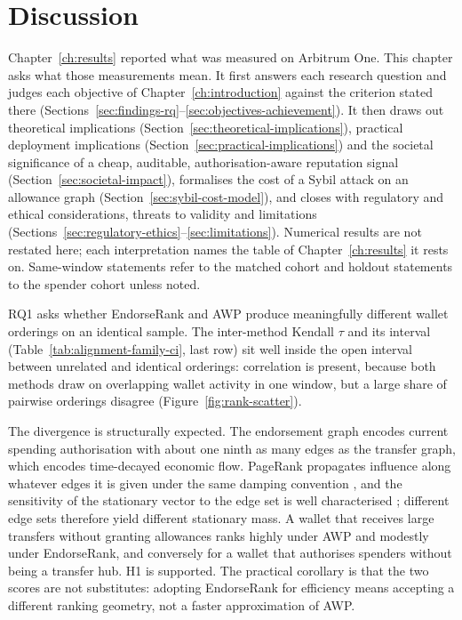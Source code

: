 \chapter{Discussion}
\label{ch:discussion}

Chapter~\ref{ch:results} reported what was measured on Arbitrum One. This chapter asks what those measurements mean. It first answers each research question and judges each objective of Chapter~\ref{ch:introduction} against the criterion stated there (Sections~\ref{sec:findings-rq}--\ref{sec:objectives-achievement}). It then draws out theoretical implications (Section~\ref{sec:theoretical-implications}), practical deployment implications (Section~\ref{sec:practical-implications}) and the societal significance of a cheap, auditable, authorisation-aware reputation signal (Section~\ref{sec:societal-impact}), formalises the cost of a Sybil attack on an allowance graph (Section~\ref{sec:sybil-cost-model}), and closes with regulatory and ethical considerations, threats to validity and limitations (Sections~\ref{sec:regulatory-ethics}--\ref{sec:limitations}). Numerical results are not restated here; each interpretation names the table of Chapter~\ref{ch:results} it rests on. Same-window statements refer to the matched cohort and holdout statements to the spender cohort unless noted.



RQ1 asks whether EndorseRank and AWP produce meaningfully different wallet orderings on an identical sample. The inter-method Kendall $\tau$ and its interval (Table~\ref{tab:alignment-family-ci}, last row) sit well inside the open interval between unrelated and identical orderings: correlation is present, because both methods draw on overlapping wallet activity in one window, but a large share of pairwise orderings disagree (Figure~\ref{fig:rank-scatter}).

The divergence is structurally expected. The endorsement graph encodes current spending authorisation with about one ninth as many edges as the transfer graph, which encodes time-decayed economic flow. PageRank propagates influence along whatever edges it is given under the same damping convention , and the sensitivity of the stationary vector to the edge set is well characterised ; different edge sets therefore yield different stationary mass. A wallet that receives large transfers without granting allowances ranks highly under AWP and modestly under EndorseRank, and conversely for a wallet that authorises spenders without being a transfer hub. H1 is supported. The practical corollary is that the two scores are not substitutes: adopting EndorseRank for efficiency means accepting a different ranking geometry, not a faster approximation of AWP.

